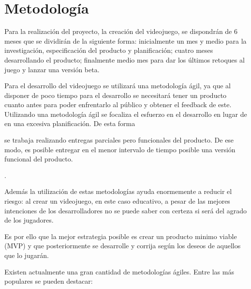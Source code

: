 \chapter{Metodología}

Para la realización del proyecto, la creación del videojuego, se dispondrán de 6 meses que se dividirán de la siguiente forma: inicialmente un mes y medio para la investigación, especificación del producto y planificación; cuatro meses desarrollando el producto; finalmente medio mes para dar los últimos retoques al juego y lanzar una versión beta.

Para el desarrollo del videojuego se utilizará una metodología ágil, ya que al disponer de poco tiempo para el desarrollo se necesitará tener un producto cuanto antes para poder enfrentarlo al público y obtener el feedback de este. Utilizando una metodología ágil se focaliza el esfuerzo en el desarrollo en lugar de en una excesiva planificación. De esta forma 
\begin{itquote}
	se trabaja realizando entregas parciales pero funcionales del producto. De ese modo, es posible entregar en el menor intervalo de tiempo posible una versión funcional del producto.
	\begin{flushright}
	 	\cite{eduardomartinez2014}.
 	\end{flushright}
\end{itquote}

Además la utilización de estas metodologías ayuda enormemente a reducir el riesgo: al crear un videojuego, en este caso educativo, a pesar de las mejores intenciones de los desarrolladores no se puede saber con certeza si será del agrado de los jugadores.

Es por ello que la mejor estrategia posible es crear un producto minimo viable (MVP) y que posteriormente se desarrolle y corrija según los deseos de aquellos que lo jugarán. 

Existen actualmente una gran cantidad de metodologías ágiles. Entre las más populares se pueden destacar: 

